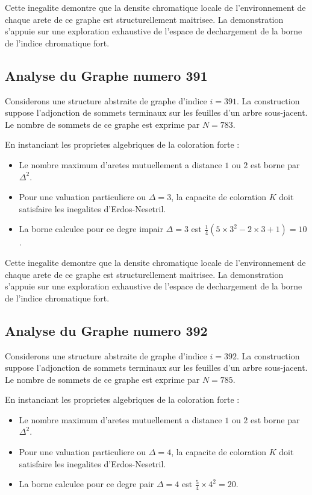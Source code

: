 \documentclass[11pt,a4paper]{article}
\begin{document}
Cette inegalite demontre que la densite chromatique locale de l'environnement de chaque arete de ce graphe est structurellement maitrisee. La demonstration s'appuie sur une exploration exhaustive de l'espace de dechargement de la borne de l'indice chromatique fort.

\subsection{Analyse du Graphe numero 391}
Considerons une structure abstraite de graphe d'indice $i = 391$. La construction suppose l'adjonction de sommets terminaux sur les feuilles d'un arbre sous-jacent. Le nombre de sommets de ce graphe est exprime par $N = 783$.

En instanciant les proprietes algebriques de la coloration forte :
\begin{itemize}
\item Le nombre maximum d'aretes mutuellement a distance $1$ ou $2$ est borne par $\Delta^2$.
\item Pour une valuation particuliere ou $\Delta = 3$, la capacite de coloration $K$ doit satisfaire les inegalites d'Erdos-Nesetril.
\item La borne calculee pour ce degre impair $\Delta = 3$ est $\frac{1}{4}(5 \times 3^2 - 2 \times 3 + 1) = 10$.
\end{itemize}

Cette inegalite demontre que la densite chromatique locale de l'environnement de chaque arete de ce graphe est structurellement maitrisee. La demonstration s'appuie sur une exploration exhaustive de l'espace de dechargement de la borne de l'indice chromatique fort.

\subsection{Analyse du Graphe numero 392}
Considerons une structure abstraite de graphe d'indice $i = 392$. La construction suppose l'adjonction de sommets terminaux sur les feuilles d'un arbre sous-jacent. Le nombre de sommets de ce graphe est exprime par $N = 785$.

En instanciant les proprietes algebriques de la coloration forte :
\begin{itemize}
\item Le nombre maximum d'aretes mutuellement a distance $1$ ou $2$ est borne par $\Delta^2$.
\item Pour une valuation particuliere ou $\Delta = 4$, la capacite de coloration $K$ doit satisfaire les inegalites d'Erdos-Nesetril.
\item La borne calculee pour ce degre pair $\Delta = 4$ est $\frac{5}{4} \times 4^2 = 20$.
\end{itemize}
\end{document}
